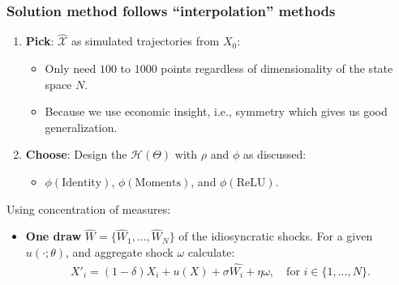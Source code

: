 \documentclass[aspectratio=169,10pt]{beamer}
\newcommand{\emphcolor}[1]{\textbf{\textcolor{emphcolorval}{#1}}}
\newcommand{\Xtrain}{\hat{\mathcal{X}}}
\begin{document}
	\begin{frame}
		\frametitle{Solution method follows ``interpolation'' methods}
		\begin{enumerate}
			\item \emphcolor{Pick}: $\Xtrain$ as simulated trajectories from $X_0$:\vspace{0.1in}
			\begin{itemize}
				\item Only need $100$ to $1000$ points regardless of dimensionality of the state space $N$.\vspace{0.1in}
				\item Because we use economic insight, i.e., symmetry which gives us good generalization. \vspace{0.1in}
			\end{itemize}
			\item \emphcolor{Choose}:  Design the $\mathcal{H}(\Theta)$ with $\rho$ and $\phi$ as discussed:\vspace{0.1in}
			\begin{itemize}
				\item $\phi(\text{Identity})$, $\phi(\text{Moments})$, and  $\phi(\text{ReLU})$.\vspace{0.1in}
			\end{itemize}
   \end{enumerate}

	Using concentration of measures:\vspace{0.1in}
	\begin{itemize}
		\item\emphcolor{One draw} $\hat{W}= \{\hat{W}_1,\ldots,\hat{W}_N\}$ of the idiosyncratic shocks. For a given $u(\cdot;\theta)$, and aggregate shock $\omega$ calculate:
		\begin{align*}
			X'_i = (1-\delta)X_i + u(X) + \sigma \hat{W_i} + \eta \omega,\quad\text{for } i \in \{1,...,N\}.
		\end{align*}
	\end{itemize}		 
	\end{frame}
	
\end{document}
